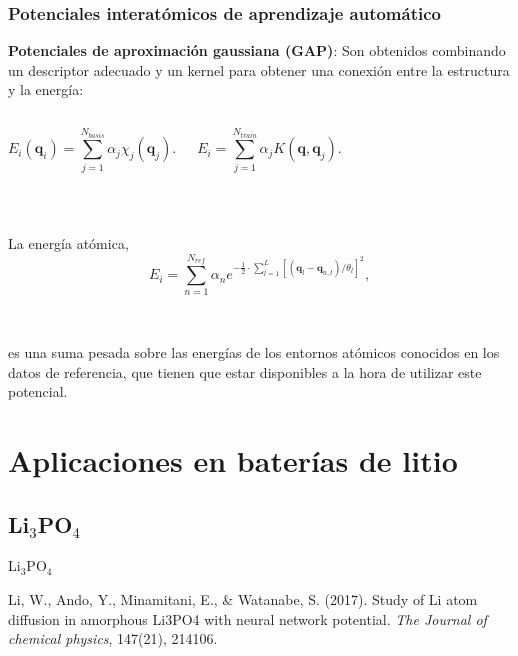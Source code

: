 \documentclass[aspectratio=169]{beamer}
\let\oldtextbf\textbf
\renewcommand{\textbf}[1]{\textcolor{nordblue}{\oldtextbf{#1}}}
\begin{document}
    \begin{frame}
        \frametitle{Potenciales interatómicos de aprendizaje automático}
        
        \textbf{Potenciales de aproximación gaussiana (GAP)}: Son obtenidos 
        combinando un descriptor adecuado y un kernel para obtener una conexión 
        entre la estructura y la energía:

        \begin{columns}
            $$
            E_i(\mathbf{q}_i) = \sum_{j=1}^{N_{basis}} \alpha_j \chi_j(\mathbf{q}_j).
            $$

            $$
            E_i = \sum_{j=1}^{N_{train}} \alpha_j K(\mathbf{q}, \mathbf{q}_j).
            $$
        \end{columns}

        \ \pause

        La energía atómica,
        $$
        E_i  = \sum_{n=1}^{N_{ref}} \alpha_n e^{-\frac{1}{2}\cdot\sum_{l=1}^L [(\mathbf{q}_l - \mathbf{q}_{n,l}) / \theta_l]^2},
        $$

        \ \pause

        es una suma pesada sobre las energías de los entornos atómicos conocidos
        en los datos de referencia, que tienen que estar disponibles a la hora
        de utilizar este potencial.

    \end{frame}

    \section{Aplicaciones en baterías de litio}

    \subsection{Li$_3$PO$_4$}
    \begin{frame}
        \begin{center}
            {\huge Li$_3$PO$_4$}
        \end{center}
        \tiny{
            Li, W., Ando, Y., Minamitani, E., \& Watanabe, S. (2017). 
            Study of Li atom diffusion in amorphous Li3PO4 with neural 
            network potential. \textit{The Journal of chemical physics}, 
            147(21), 214106.
        }
    \end{frame}
\end{document}
